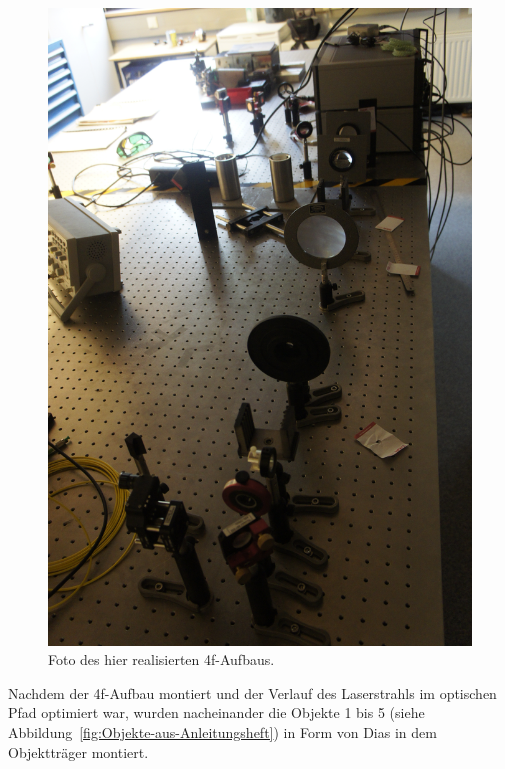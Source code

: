 \begin{figure}
	\centering
	\includegraphics[width=0.7\linewidth, angle=90]{images/_DSC7967.JPG}
	\caption{Foto des hier realisierten 4f-Aufbaus.}
	\label{fig:_DSC7967}
\end{figure}



Nachdem der 4f-Aufbau montiert und der Verlauf des Laserstrahls im optischen Pfad optimiert war, wurden nacheinander die Objekte 1 bis 5 (siehe Abbildung~\ref{fig:Objekte-aus-Anleitungsheft}) in Form von Dias in dem Objektträger montiert.

